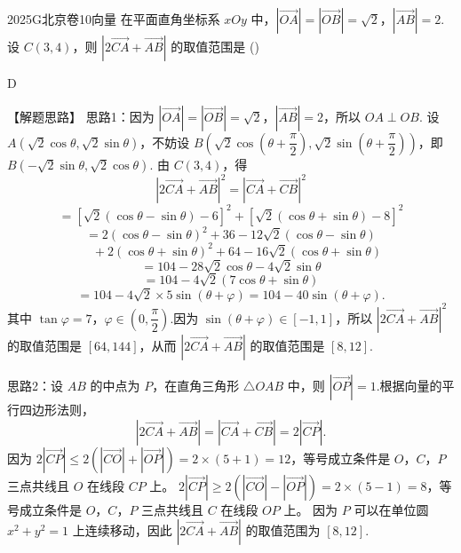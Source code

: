 
\begin{problem}{2025}{G}{北京卷}{10}{向量}
在平面直角坐标系 $ xOy $ 中，$ |\overrightarrow{OA}| = |\overrightarrow{OB}| = \sqrt{2} $，$ |\overrightarrow{AB}| = 2 $.设 $ C(3,4) $，则 $ |2\overrightarrow{CA} + \overrightarrow{AB}| $ 的取值范围是 (\hspace{1cm})
\begin{choices}
\choice{{[6,14]}}
\choice{{[6,12]}}
\choice{{[8,14]}}
\choice{{[8,12]}}
\end{choices}
\end{problem}

\begin{answer}
D
\end{answer}

\begin{solutions}
【解题思路】 思路1：因为 $ |\overrightarrow{OA}| = |\overrightarrow{OB}| = \sqrt{2} $，$ |\overrightarrow{AB}| = 2 $，所以 $ OA \perp OB $.  
设 $ A(\sqrt{2}\cos\theta, \sqrt{2}\sin\theta) $，不妨设 $ B\left(\sqrt{2}\cos\left(\theta+\dfrac{\pi}{2}\right), \sqrt{2}\sin\left(\theta+\dfrac{\pi}{2}\right)\right) $，即 $ B(-\sqrt{2}\sin\theta, \sqrt{2}\cos\theta) $.  
由 $ C(3,4) $，得  
$$
|2\overrightarrow{CA} + \overrightarrow{AB}|^2 = |\overrightarrow{CA} + \overrightarrow{CB}|^2
$$  
$$
= \left[\sqrt{2}(\cos\theta - \sin\theta) - 6\right]^2 + \left[\sqrt{2}(\cos\theta + \sin\theta) - 8\right]^2
$$  
$$
= 2(\cos\theta - \sin\theta)^2 + 36 - 12\sqrt{2}(\cos\theta - \sin\theta)
$$  
$$
\quad + 2(\cos\theta + \sin\theta)^2 + 64 - 16\sqrt{2}(\cos\theta + \sin\theta)
$$  
$$
= 104 - 28\sqrt{2}\cos\theta - 4\sqrt{2}\sin\theta
$$  
$$
= 104 - 4\sqrt{2}(7\cos\theta + \sin\theta)
$$  
$$
= 104 - 4\sqrt{2} \times 5\sin(\theta + \varphi) = 104 - 40\sin(\theta + \varphi) .
$$  
其中 $ \tan\varphi = 7 $，$ \varphi \in \left(0, \dfrac{\pi}{2}\right) $.因为 $ \sin(\theta + \varphi) \in [-1,1] $，所以 $ |2\overrightarrow{CA} + \overrightarrow{AB}|^2 $ 的取值范围是 $ [64,144] $，从而 $ |2\overrightarrow{CA} + \overrightarrow{AB}| $ 的取值范围是 $ [8,12] $.

思路2：设 $ AB $ 的中点为 $ P $，在直角三角形 $ \triangle OAB $ 中，则 $ |\overrightarrow{OP}| = 1 $.根据向量的平行四边形法则，  
$$
|2\overrightarrow{CA} + \overrightarrow{AB}| = |\overrightarrow{CA} + \overrightarrow{CB}| = 2|\overrightarrow{CP}| .
$$  
因为 $ 2|\overrightarrow{CP}| \leq 2(|\overrightarrow{CO}| + |\overrightarrow{OP}|) = 2 \times (5 + 1) = 12 $，等号成立条件是 $ O $，$ C $，$ P $ 三点共线且 $ O $ 在线段 $ CP $ 上。  
$ 2|\overrightarrow{CP}| \geq 2(|\overrightarrow{CO}| - |\overrightarrow{OP}|) = 2 \times (5 - 1) = 8 $，等号成立条件是 $ O $，$ C $，$ P $ 三点共线且 $ C $ 在线段 $ OP $ 上。  
因为 $ P $ 可以在单位圆 $ x^2 + y^2 = 1 $ 上连续移动，因此 $ |2\overrightarrow{CA} + \overrightarrow{AB}| $ 的取值范围为 $ [8,12] $.
\end{solutions}